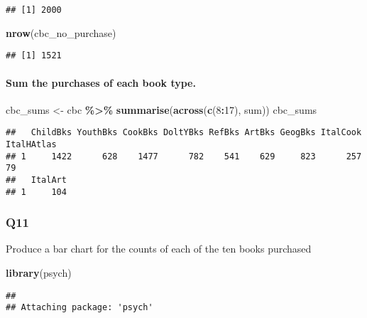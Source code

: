\documentclass[
]{article}
\newenvironment{Shaded}{\begin{snugshade}}{\end{snugshade}}
\newcommand{\DecValTok}[1]{\textcolor[rgb]{0.00,0.00,0.81}{#1}}
\newcommand{\FunctionTok}[1]{\textcolor[rgb]{0.13,0.29,0.53}{\textbf{#1}}}
\newcommand{\NormalTok}[1]{#1}
\newcommand{\OtherTok}[1]{\textcolor[rgb]{0.56,0.35,0.01}{#1}}
\newcommand{\SpecialCharTok}[1]{\textcolor[rgb]{0.81,0.36,0.00}{\textbf{#1}}}
\begin{document}
\begin{verbatim}
## [1] 2000
\end{verbatim}

\begin{Shaded}
\begin{Highlighting}[]
\FunctionTok{nrow}\NormalTok{(cbc\_no\_purchase)}
\end{Highlighting}
\end{Shaded}

\begin{verbatim}
## [1] 1521
\end{verbatim}

\paragraph{Sum the purchases of each book
type.}\label{sum-the-purchases-of-each-book-type.}

\begin{Shaded}
\begin{Highlighting}[]
\NormalTok{cbc\_sums }\OtherTok{\textless{}{-}}\NormalTok{ cbc }\SpecialCharTok{\%\textgreater{}\%} \FunctionTok{summarise}\NormalTok{(}\FunctionTok{across}\NormalTok{(}\FunctionTok{c}\NormalTok{(}\DecValTok{8}\SpecialCharTok{:}\DecValTok{17}\NormalTok{), sum))}
\NormalTok{cbc\_sums}
\end{Highlighting}
\end{Shaded}

\begin{verbatim}
##   ChildBks YouthBks CookBks DoltYBks RefBks ArtBks GeogBks ItalCook ItalHAtlas
## 1     1422      628    1477      782    541    629     823      257         79
##   ItalArt
## 1     104
\end{verbatim}

\subsubsection{Q11}\label{q11}

Produce a bar chart for the counts of each of the ten books purchased

\begin{Shaded}
\begin{Highlighting}[]
\FunctionTok{library}\NormalTok{(psych)}
\end{Highlighting}
\end{Shaded}

\begin{verbatim}
## 
## Attaching package: 'psych'
\end{verbatim}
\end{document}
